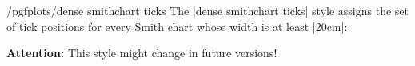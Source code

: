 \begin{stylekey}{/pgfplots/dense smithchart ticks}
    The |dense smithchart ticks| style assigns the set of tick positions for
    every Smith chart whose width is at least |20cm|:
%
\pgfplotsexpensiveexample
\begin{codeexample}[]
\end{codeexample}

    \textbf{Attention:} This style might change in future versions!


\end{stylekey}
